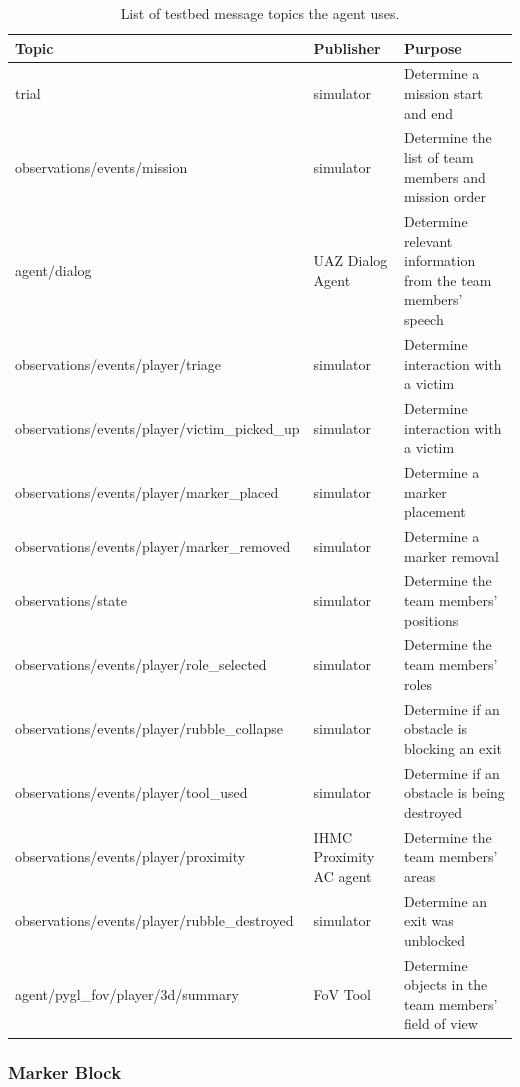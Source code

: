 %
%
\begin{table}
    \small
    \centering
    \begin{tabularx}{6in}{lp{1.2in}X}
        \toprule
        Topic & Publisher & Purpose\\
        \midrule  
    	trial & simulator & Determine a mission start and end \\
    	observations/events/mission & simulator & Determine the list of team members and mission order \\    
    	agent/dialog & UAZ Dialog Agent & Determine relevant information from the team members' speech \\
    	observations/events/player/triage & simulator & Determine interaction with a victim \\    
    	observations/events/player/victim\_picked\_up & simulator & Determine interaction with a victim \\
    	observations/events/player/marker\_placed & simulator & Determine a marker placement \\
    	observations/events/player/marker\_removed & simulator & Determine a marker removal \\  
    	observations/state & simulator & Determine the team members' positions \\	
    	observations/events/player/role\_selected & simulator & Determine the team members' roles \\
    	observations/events/player/rubble\_collapse & simulator & Determine if an obstacle is blocking an exit \\
    	observations/events/player/tool\_used & simulator & Determine if an obstacle is being destroyed \\
    	observations/events/player/proximity & IHMC Proximity AC agent & Determine the team members' areas \\
    	observations/events/player/rubble\_destroyed & simulator & Determine an exit was unblocked \\   
    	agent/pygl\_fov/player/3d/summary & FoV Tool & Determine objects in the team members' field of view \\    	
        \bottomrule
    \end{tabularx}
    \caption{%
        List of testbed message topics the agent uses.
    }
    \label{tab:intervention_variables}
\end{table}
%


\subsubsection{Marker Block}


